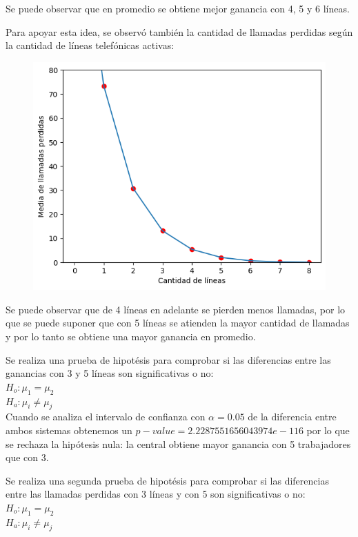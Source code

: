 \documentclass{article}
\begin{document}
			Se puede observar que en promedio se obtiene mejor ganancia con 4, 5 y 6 líneas.
			
			Para apoyar esta idea, se observó también la cantidad de llamadas perdidas según la cantidad de líneas telefónicas activas:
			
			\begin{figure}[H]
				\centering
				\includegraphics[width=0.7\linewidth]{./output1.png}
				\label{fig:enter-label}
			\end{figure}
			
			Se puede observar que de 4 líneas en adelante se pierden menos llamadas, por lo que se puede suponer que con 5 líneas se atienden la mayor cantidad de llamadas y por lo tanto se obtiene una mayor ganancia en promedio.
			
			\vspace*{0.5cm}
			Se realiza una prueba de hipotésis para comprobar si las diferencias entre las ganancias con 3 y 5 líneas son significativas o no: \\
			$H_o: \mu_1 = \mu_2 $\\
			$H_a: \mu_i \neq \mu_j$ \\
			
			Cuando se analiza el intervalo de confianza con $\alpha=0.05$ de la diferencia entre ambos sistemas obtenemos un $p-value = 2.2287551656043974e-116$ por lo que se rechaza la hipótesis nula: la central obtiene mayor ganancia con 5 trabajadores que con 3.
			
			\vspace*{0.5cm}
			Se realiza una segunda prueba de hipotésis para comprobar si las diferencias entre las llamadas perdidas con 3 líneas y con 5 son significativas o no: \\
			$H_o: \mu_1 = \mu_2 $\\
			$H_a: \mu_i \neq \mu_j$ \\
			
\end{document}
